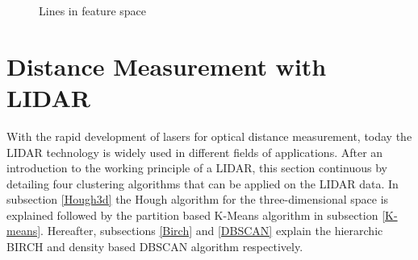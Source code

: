 \begin{figure}
\begin{minipage}[t]{0.48\textwidth}
\begin{centering}
  			\caption{Lines in feature space}
  			\label{fig_Hough2}
  		\end{centering}
  	\end{minipage}
  \end{figure}
  
   \section{Distance Measurement with \ac{LIDAR}} \label{LIDAR}
   With the rapid development of lasers for optical distance measurement, today the \ac{LIDAR} technology is widely used in different fields of applications. After an introduction to the working principle of a \ac{LIDAR}, this section continuous by detailing four clustering algorithms that can be applied on the \ac{LIDAR} data. In subsection \ref{Hough3d} the Hough algorithm for the three-dimensional space is explained followed by the partition based K-Means algorithm in subsection \ref{K-means}. Hereafter, subsections \ref{Birch} and \ref{DBSCAN} explain the hierarchic \ac{BIRCH} and density based \ac{DBSCAN} algorithm respectively.\\
   

